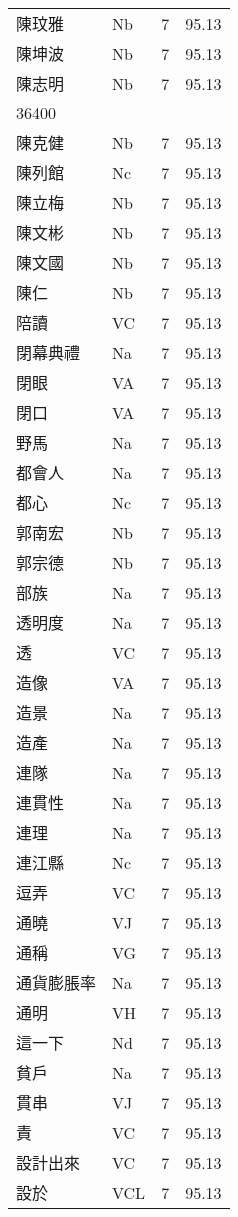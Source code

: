 \documentclass[twocolumn]{book}
\begin{document}
\begin{supertabular}{llrr}
陳玟雅 & Nb & 7 &  95.13\\
陳坤波 & Nb & 7 &  95.13\\
陳志明 & Nb & 7 &  95.13\\
36400\\
陳克健 & Nb & 7 &  95.13\\
陳列館 & Nc & 7 &  95.13\\
陳立梅 & Nb & 7 &  95.13\\
陳文彬 & Nb & 7 &  95.13\\
陳文國 & Nb & 7 &  95.13\\
陳仁 & Nb & 7 &  95.13\\
陪讀 & VC & 7 &  95.13\\
閉幕典禮 & Na & 7 &  95.13\\
閉眼 & VA & 7 &  95.13\\
閉口 & VA & 7 &  95.13\\
野馬 & Na & 7 &  95.13\\
都會人 & Na & 7 &  95.13\\
都心 & Nc & 7 &  95.13\\
郭南宏 & Nb & 7 &  95.13\\
郭宗德 & Nb & 7 &  95.13\\
部族 & Na & 7 &  95.13\\
透明度 & Na & 7 &  95.13\\
透 & VC & 7 &  95.13\\
造像 & VA & 7 &  95.13\\
造景 & Na & 7 &  95.13\\
造產 & Na & 7 &  95.13\\
連隊 & Na & 7 &  95.13\\
連貫性 & Na & 7 &  95.13\\
連理 & Na & 7 &  95.13\\
連江縣 & Nc & 7 &  95.13\\
逗弄 & VC & 7 &  95.13\\
通曉 & VJ & 7 &  95.13\\
通稱 & VG & 7 &  95.13\\
通貨膨脹率 & Na & 7 &  95.13\\
通明 & VH & 7 &  95.13\\
這一下 & Nd & 7 &  95.13\\
貧戶 & Na & 7 &  95.13\\
貫串 & VJ & 7 &  95.13\\
責 & VC & 7 &  95.13\\
設計出來 & VC & 7 &  95.13\\
設於 & VCL & 7 &  95.13\\

\end{supertabular}
\end{document}
